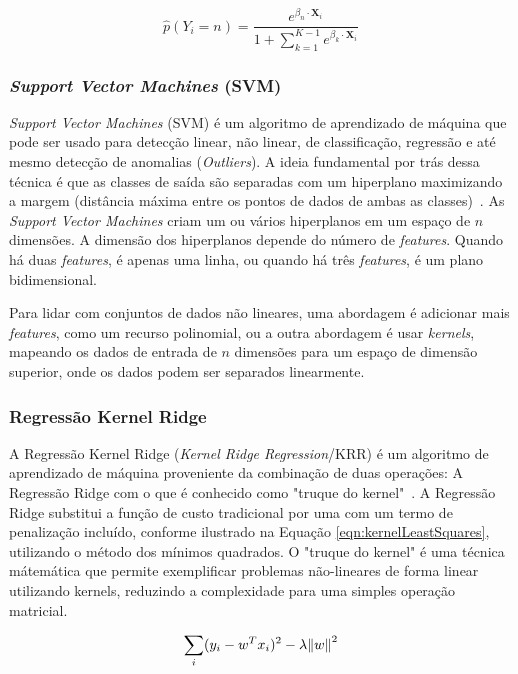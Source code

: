 \documentclass[portugues]{ic-tese}
\begin{document}
\begin{equation}
\hat{p}(Y_i = n) = \frac{e^{\beta_{n} \cdot \textbf{X}_{i}}}{1 + \sum^{K-1}_{k=1} e^{\beta_{k} \cdot \textbf{X}_{i}}}
\end{equation}

\subsubsection{\textit{Support Vector Machines} (SVM)}

\textit{Support Vector Machines} (SVM) é um algoritmo de aprendizado de máquina que pode ser usado para detecção linear, não linear, de classificação, regressão e até mesmo detecção de anomalias (\textit{Outliers}). A ideia fundamental por trás dessa técnica é que as classes de saída são separadas com um hiperplano maximizando a margem (distância máxima entre os pontos de dados de ambas as classes)~\citep{Steinwart_2008}. As \textit{Support Vector Machines} criam um ou vários hiperplanos em um espaço de $n$ dimensões. A dimensão dos hiperplanos depende do número de \textit{features}. Quando há duas \textit{features}, é apenas uma linha, ou quando há três \textit{features}, é um plano bidimensional.

Para lidar com conjuntos de dados não lineares, uma abordagem é adicionar mais \textit{features}, como um recurso polinomial, ou a outra abordagem é usar \textit{kernels}, mapeando os dados de entrada de $n$ dimensões para um espaço de dimensão superior, onde os dados podem ser separados linearmente.

\subsubsection{Regressão Kernel Ridge}

A Regressão Kernel Ridge (\textit{Kernel Ridge Regression}/KRR) é um algoritmo de aprendizado de máquina proveniente da combinação de duas operações: A Regressão Ridge com o que é conhecido como "truque do kernel"~\citep{Witten_2016}. A Regressão Ridge substitui a função de custo tradicional por uma com um termo de penalização incluído, conforme ilustrado na Equação \ref{eqn:kernelLeastSquares}, utilizando o método dos mínimos quadrados. O "truque do kernel" é uma técnica mátemática que permite exemplificar problemas não-lineares de forma linear utilizando kernels, reduzindo a complexidade para uma simples operação matricial.

\begin{equation}
\label{eqn:kernelLeastSquares}
\sum_{i} (y_{i} - w^{T}x_i)^{2} - \lambda \norm{w}^{2}
\end{equation}
\end{document}

